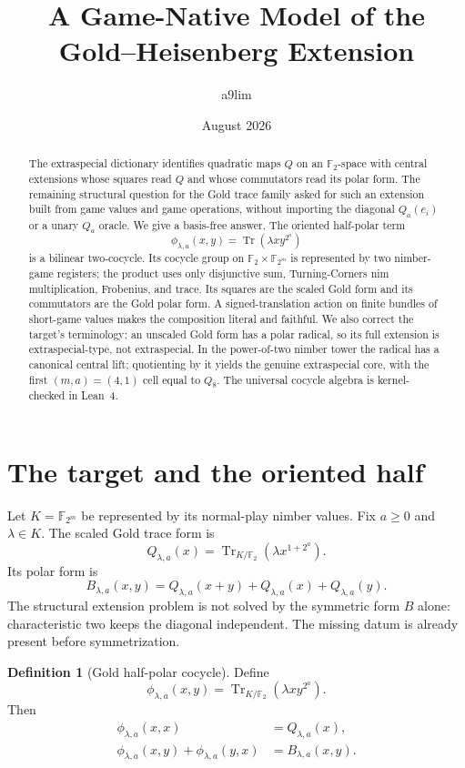 \documentclass[11pt]{article}
\title{A Game-Native Model of the\\ Gold--Heisenberg Extension}
\author{a9lim}
\date{August 2026}
\theoremstyle{definition}
\newtheorem{definition}[theorem]{Definition}
\theoremstyle{remark}
\newcommand{\F}{\mathbb{F}}
\newcommand{\Tr}{\operatorname{Tr}}
\begin{document}
\maketitle

\begin{abstract}
The extraspecial dictionary identifies quadratic maps $Q$ on an
$\F_2$-space with central extensions whose squares read $Q$ and whose
commutators read its polar form.  The remaining structural question for
the Gold trace family asked for such an extension built from game values
and game operations, without importing the diagonal $Q_a(e_i)$ or a unary
$Q_a$ oracle.  We give a basis-free answer.  The oriented half-polar term
\[
 \phi_{\lambda,a}(x,y)=\Tr(\lambda x y^{2^a})
\]
is a bilinear two-cocycle.  Its cocycle group on
$\F_2\times\F_{2^m}$ is represented by two nimber-game registers; the
product uses only disjunctive sum, Turning-Corners nim multiplication,
Frobenius, and trace.  Its squares are the scaled Gold form and its
commutators are the Gold polar form.  A signed-translation action on
finite bundles of short-game values makes the composition literal and
faithful.  We also correct the target's terminology: an unscaled Gold
form has a polar radical, so its full extension is extraspecial-type, not
extraspecial.  In the power-of-two nimber tower the radical has a
canonical central lift; quotienting by it yields the genuine extraspecial
core, with the first $(m,a)=(4,1)$ cell equal to $Q_8$.  The universal
cocycle algebra is kernel-checked in Lean~4.
\end{abstract}

\section{The target and the oriented half}

Let $K=\F_{2^m}$ be represented by its normal-play nimber values.  Fix
$a\geq0$ and $\lambda\in K$.  The scaled Gold trace form is
\[
 Q_{\lambda,a}(x)=\Tr_{K/\F_2}(\lambda x^{1+2^a}).
\]
Its polar form is
\[
 B_{\lambda,a}(x,y)=Q_{\lambda,a}(x+y)+Q_{\lambda,a}(x)
 +Q_{\lambda,a}(y).
\]
The structural extension problem is not solved by the symmetric form
$B$ alone: characteristic two keeps the diagonal independent.  The
missing datum is already present before symmetrization.

\begin{definition}[Gold half-polar cocycle]\label{def:phi}
Define
\[
 \phi_{\lambda,a}(x,y)=\Tr_{K/\F_2}(\lambda x y^{2^a}).
\]
Then
\begin{align*}
 \phi_{\lambda,a}(x,x)&=Q_{\lambda,a}(x),\\
 \phi_{\lambda,a}(x,y)+\phi_{\lambda,a}(y,x)
 &=B_{\lambda,a}(x,y).
\end{align*}
\end{definition}
\end{document}
